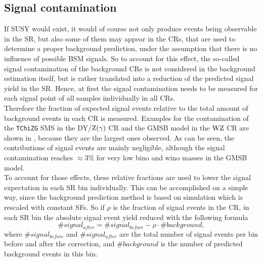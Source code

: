 \subsection{Signal contamination}\label{sec:signalCont}
If SUSY would exist, it would of course not only produce events being observable in the SR, but also some of them may appear in the CRs, that are used to determine a proper background prediction, under the assumption that there is no influence of possible BSM signals. So to account for this effect, the so-called signal contamination of the background CRs is not considered in the background estimation itself, but is rather translated into a reduction of the predicted signal yield in the SR. Hence, at first the signal contamination needs to be measured for each signal point of all samples individually in all CRs.\\
Therefore the fraction of expected signal events relative to the total amount of background events in each CR is measured. Examples for the contamination of the \texttt{TChiZG} SMS in the DY/$\mathrm{Z}(\gamma)$ CR and the GMSB model in the $\mathrm{W}\mathrm{Z}$ CR are shown in , because they are the largest ones observed. As can be seen, the contributions of signal events are mainly negligible, although the signal contamination reaches $\approx 3\%$ for very low bino and wino masses in the GMSB model.\\
To account for those effects, these relative fractions are used to lower the signal expectation in each SR bin individually. This can be accomplished on a simple way, since the background prediction method is based on simulation which is rescaled with constant SFs. So if $\rho$ is the fraction of signal events in the CR, in each SR bin the absolute signal event yield reduced with the following formula
\begin{equation}
 \#signal_{after} = \#signal_{before} - \rho\cdot\#background,
\end{equation}
where $\#signal_{before}$ and $\#signal_{after}$ are the total number of signal events per bin before and after the correction, and $\#background$ is the number of predicted background events in this bin.

